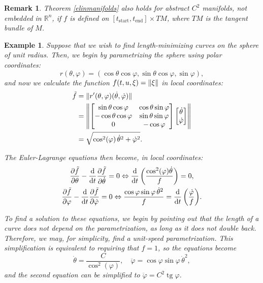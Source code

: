 \documentclass{article}
\theoremstyle{plain}
\theoremstyle{plain}
\newtheorem{remark}{Remark}
\newtheorem{example}{Example}
\theoremstyle{nonumberplain}
\theoremstyle{empty}
\newcommand{\R}{\mathbb{R}}
\newcommand{\tstart}{\mathrm{start}}
\newcommand{\tend}{\mathrm{end}}
\DeclarePairedDelimiter\norm{\lVert}{\rVert}
\DeclareMathOperator{\tg}{tg}
\begin{document}
\begin{remark}
Theorem \ref{elinmanifolds} also holds for abstract $C^2$ manifolds, not embedded in $\R^n$, if $f$ is defined on $[t_\tstart, t_\tend] \times TM$, where $TM$ is the tangent bundle of $M$.
\end{remark}

\begin{example}\label{sphere1}
Suppose that we wish to find length-minimizing curves on the sphere of unit radius. Then, we begin by parametrizing the sphere using polar coordinates:
\[r(\theta, \varphi) = (\cos\theta \cos\varphi, \sin\theta \cos\varphi, \sin\varphi),\]
and now we calculate the function $f(t,u,\xi) = \norm\xi$ in local coordinates:
\begin{align*}
\tilde f &= \norm{r'(\theta, \varphi) (\dot \theta, \dot \varphi)}\\
&= \norm*{\begin{bmatrix}
\sin\theta \cos\varphi & \cos\theta \sin\varphi\\
-\cos\theta \cos\varphi & \sin\theta \sin\varphi\\
0 & -\cos\varphi
\end{bmatrix}
\begin{bmatrix}
\dot\theta\\
\dot\varphi
\end{bmatrix}
}\\
&= \sqrt{\cos^2(\varphi) \, \dot\theta^2 + \dot\varphi^2}.
\end{align*}

The Euler-Lagrange equations then become, in local coordinates:
\begin{gather*}
\diffp{\tilde f} \theta - \diff*{\diffp{\tilde f}{\dot \theta}}t = 0 \Leftrightarrow \diff*{\left( \frac{\cos^2(\varphi) \dot \theta}{f} \right)}t = 0,\\
\diffp{\tilde f} \varphi - \diff*{\diffp{\tilde f}{\dot \varphi}}t = 0
\Leftrightarrow
\frac{\cos\varphi \sin\varphi \,\dot \theta^2}{f} = \diff*{\left( \frac{\dot \varphi}{f} \right)}t.
\end{gather*}

To find a solution to these equations, we begin by pointing out that the length of a curve does not depend on the parametrization, as long as it does not double back. Therefore, we may, for simplicity, find a unit-speed parametrization. This simplification is equivalent to requiring that $f = 1$, so the equations become
\[\dot \theta = \frac C {\cos^2(\varphi)}, \quad \ddot \varphi = \cos\varphi \sin\varphi \, \dot \theta^2,\]
and the second equation can be simplified to $\ddot \varphi = C^2 \tg \varphi$.


\end{example}
\end{document}
